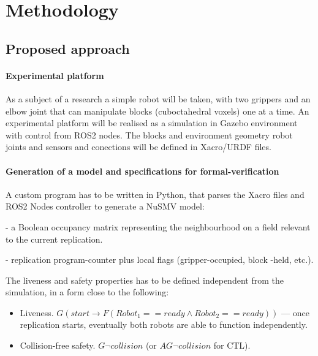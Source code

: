 
\chapter{Methodology}

\section{Proposed approach}

\subsubsection{Experimental platform}
As a subject of a research a simple robot will be taken, with two grippers and an elbow joint that can manipulate blocks (cuboctahedral voxels) one at a time.
An experimental platform will be realised as a simulation in Gazebo environment with control from ROS2 nodes. The  blocks and environment geometry robot joints and sensors and conections 
will be defined in Xacro/URDF files. 


\subsubsection{Generation of a model and specifications for formal-verification}
A custom program has to be written in Python, that parses the Xacro files and ROS2 Nodes controller to generate a NuSMV model:

  - a Boolean occupancy matrix representing the neighbourhood on a field relevant to the current replication.

  - replication program-counter plus local flags (gripper-occupied, block -held, etc.).

  The liveness and safety properties has to be defined independent from the simulation, in a form close to the following:
  \begin{itemize}
    
      \item Liveness. $G (start \rightarrow F (Robot_1==ready \land Robot_2==ready))$ — once replication starts, eventually both robots are able to function independently.

      \item Collision-free safety. $G \neg collision$ (or $AG \neg collision$ for CTL).

\end{itemize}


